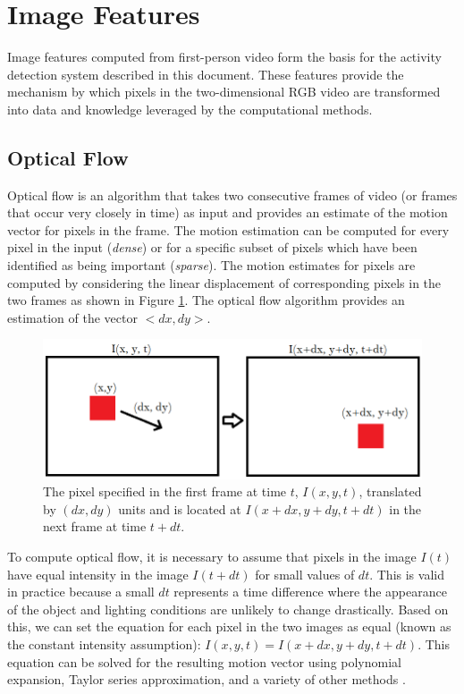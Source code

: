 \documentclass[12pt]{report}
\begin{document}
\section{Image Features}
Image features computed from first-person video form the basis for the activity detection system described in this document. These features provide the mechanism by which pixels in the two-dimensional RGB video are transformed into data and knowledge leveraged by the computational methods. 

\subsection{Optical Flow}
Optical flow is an algorithm that takes two consecutive frames of video (or frames that occur very closely in time) as input and provides an estimate of the motion vector for pixels in the frame. The motion estimation can be computed for every pixel in the input (\emph{dense}) or for a specific subset of pixels which have been identified as being important (\emph{sparse}). The motion estimates for pixels are computed by considering the linear displacement of corresponding pixels in the two frames as shown in Figure \ref{fig:optical_flow}. The optical flow algorithm provides an estimation of the vector $<dx, dy>$.

\begin{figure}
    \centering
    \includegraphics[width=\linewidth]{figure/optical_flow.png}
    \caption{The pixel specified in the first frame at time $t$, $I(x, y, t)$, translated by $(dx, dy)$ units and is located at $I(x+dx, y+dy, t+dt)$ in the next frame at time $t+dt$.}
    \label{fig:optical_flow}
\end{figure}

To compute optical flow, it is necessary to assume that pixels in the image $I(t)$ have equal intensity in the image $I(t+dt)$ for small values of $dt$. This is valid in practice because a small $dt$ represents a time difference where the appearance of the object and lighting conditions are unlikely to change drastically. Based on this, we can set the equation for each pixel in the two images as equal (known as the constant intensity assumption): $I(x, y, t)  = I(x+dx, y+dy, t+dt)$. This equation can be solved for the resulting motion vector using polynomial expansion, Taylor series approximation, and a variety of other methods \cite{Farneback2003Two-FrameOn, Horn1980DeterminingFlow, Lucas1981AnVision}.
\end{document}
